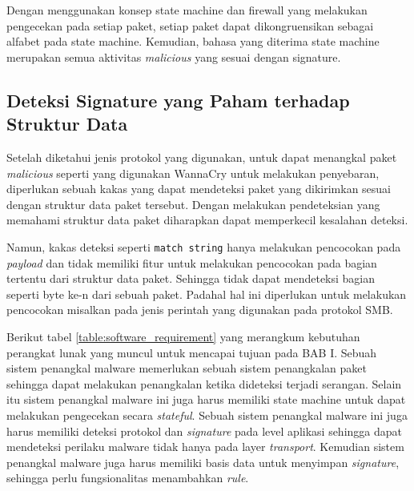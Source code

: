 Dengan menggunakan konsep state machine dan firewall yang melakukan pengecekan pada setiap paket, setiap paket dapat dikongruensikan sebagai alfabet pada state machine. Kemudian, bahasa yang diterima state machine merupakan semua aktivitas \textit{malicious} yang sesuai dengan signature.

\subsection{Deteksi Signature yang Paham terhadap Struktur Data}

Setelah diketahui jenis protokol yang digunakan, untuk dapat menangkal paket \textit{malicious} seperti yang digunakan WannaCry untuk melakukan penyebaran, diperlukan sebuah kakas yang dapat mendeteksi paket yang dikirimkan sesuai dengan struktur data paket tersebut. Dengan melakukan pendeteksian yang memahami struktur data paket diharapkan dapat memperkecil kesalahan deteksi.

Namun, kakas deteksi seperti \verb|match string| hanya melakukan pencocokan pada \textit{payload} dan tidak memiliki fitur untuk melakukan pencocokan pada bagian tertentu dari struktur data paket. Sehingga tidak dapat mendeteksi bagian seperti byte ke-n dari sebuah paket. Padahal hal ini diperlukan untuk melakukan pencocokan misalkan pada jenis perintah yang digunakan pada protokol SMB.

Berikut tabel \ref{table:software_requirement} yang merangkum kebutuhan perangkat lunak yang muncul untuk mencapai tujuan pada BAB I. Sebuah sistem penangkal malware memerlukan sebuah sistem penangkalan paket sehingga dapat melakukan penangkalan ketika dideteksi terjadi serangan. Selain itu sistem penangkal malware ini juga harus memiliki state machine untuk dapat melakukan pengecekan secara \textit{stateful}. Sebuah sistem penangkal malware ini juga harus memiliki deteksi protokol dan \textit{signature} pada level aplikasi sehingga dapat mendeteksi perilaku malware tidak hanya pada layer \textit{transport}. Kemudian sistem penangkal malware juga harus memiliki basis data untuk menyimpan \textit{signature}, sehingga perlu fungsionalitas menambahkan \textit{rule}.

